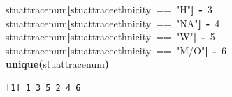 \documentclass[12pt]{article}
\makeatletter
\newcommand{\hlnumber}[1]{\textcolor[rgb]{0,0,0}{#1}}%
\newcommand{\hlfunctioncall}[1]{\textcolor[rgb]{0.501960784313725,0,0.329411764705882}{\textbf{#1}}}%
\newcommand{\hlstring}[1]{\textcolor[rgb]{0.6,0.6,1}{#1}}%
\newcommand{\hlkeyword}[1]{\textcolor[rgb]{0,0,0}{\textbf{#1}}}%
\newcommand{\hlassignement}[1]{\textcolor[rgb]{0,0,0}{\textbf{#1}}}%
\newcommand{\hlsymbol}[1]{\textcolor[rgb]{0,0,0}{#1}}%
\newcommand{\hlstd}[1]{\textcolor[rgb]{0,0,0}{#1}}%
\newenvironment{kframe}{%
 \def\FrameCommand##1{\hskip\@totalleftmargin \hskip-\fboxsep
 \colorbox{shadecolor}{##1}\hskip-\fboxsep
     \hskip-\linewidth \hskip-\@totalleftmargin \hskip\columnwidth}%
 \MakeFramed {\advance\hsize-\width
   \@totalleftmargin\z@ \linewidth\hsize
   \@setminipage}}%
 {\par\unskip\endMakeFramed}
\newenvironment{knitrout}{}{} %
\makeatother
\begin{document}
\begin{knitrout}
\begin{kframe}
\begin{flushleft}
\hlstd{}\hlsymbol{stuatt}\hlkeyword{\usebox{\hlnormalsizeboxdollar}}\hlsymbol{race\usebox{\hlnormalsizeboxunderscore}num}\hlkeyword{[}\hlsymbol{stuatt}\hlkeyword{\usebox{\hlnormalsizeboxdollar}}\hlsymbol{race\usebox{\hlnormalsizeboxunderscore}ethnicity}{\ }=={\ }\hlstring{"{}H"{}}\hlkeyword{]}{\ }\hlassignement{\usebox{\hlnormalsizeboxlessthan}-}{\ }\hlnumber{3}\hspace*{\fill}\\
\hlstd{}\hlsymbol{stuatt}\hlkeyword{\usebox{\hlnormalsizeboxdollar}}\hlsymbol{race\usebox{\hlnormalsizeboxunderscore}num}\hlkeyword{[}\hlsymbol{stuatt}\hlkeyword{\usebox{\hlnormalsizeboxdollar}}\hlsymbol{race\usebox{\hlnormalsizeboxunderscore}ethnicity}{\ }=={\ }\hlstring{"{}NA"{}}\hlkeyword{]}{\ }\hlassignement{\usebox{\hlnormalsizeboxlessthan}-}{\ }\hlnumber{4}\hspace*{\fill}\\
\hlstd{}\hlsymbol{stuatt}\hlkeyword{\usebox{\hlnormalsizeboxdollar}}\hlsymbol{race\usebox{\hlnormalsizeboxunderscore}num}\hlkeyword{[}\hlsymbol{stuatt}\hlkeyword{\usebox{\hlnormalsizeboxdollar}}\hlsymbol{race\usebox{\hlnormalsizeboxunderscore}ethnicity}{\ }=={\ }\hlstring{"{}W"{}}\hlkeyword{]}{\ }\hlassignement{\usebox{\hlnormalsizeboxlessthan}-}{\ }\hlnumber{5}\hspace*{\fill}\\
\hlstd{}\hlsymbol{stuatt}\hlkeyword{\usebox{\hlnormalsizeboxdollar}}\hlsymbol{race\usebox{\hlnormalsizeboxunderscore}num}\hlkeyword{[}\hlsymbol{stuatt}\hlkeyword{\usebox{\hlnormalsizeboxdollar}}\hlsymbol{race\usebox{\hlnormalsizeboxunderscore}ethnicity}{\ }=={\ }\hlstring{"{}M/O"{}}\hlkeyword{]}{\ }\hlassignement{\usebox{\hlnormalsizeboxlessthan}-}{\ }\hlnumber{6}\hspace*{\fill}\\
\hlstd{}\hlfunctioncall{unique}\hlkeyword{(}\hlsymbol{stuatt}\hlkeyword{\usebox{\hlnormalsizeboxdollar}}\hlsymbol{race\usebox{\hlnormalsizeboxunderscore}num}\hlkeyword{)}\mbox{}
\normalfont
\end{flushleft}
\begin{verbatim}
[1] 1 3 5 2 4 6
\end{verbatim}
\end{kframe}
\end{knitrout}

\end{document}
